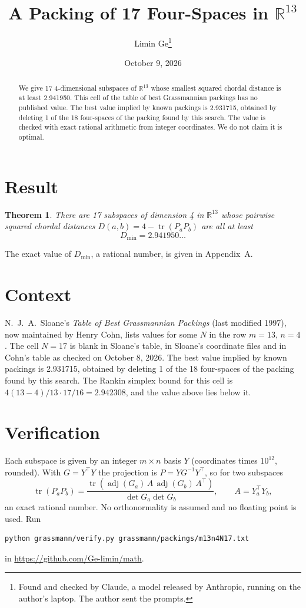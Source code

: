 \documentclass[11pt,a4paper]{article}
\title{A Packing of 17 Four-Spaces in $\mathbb{R}^{13}$}
\author{Limin Ge\thanks{Found and checked by Claude, a model released by Anthropic, running on the author's laptop. The author sent the prompts.}}
\date{October 9, 2026}
\newtheorem*{theorem}{Theorem}
\begin{document}
\maketitle
\begin{abstract}
We give 17 4-dimensional subspaces of $\mathbb{R}^{13}$ whose smallest squared chordal distance is at least 2.941950. This cell of the table of best Grassmannian packings has no published value. The best value implied by known packings is 2.931715, obtained by deleting 1 of the 18 four-spaces of the packing found by this search. The value is checked with exact rational arithmetic from integer coordinates. We do not claim it is optimal.
\end{abstract}

\section{Result}
\begin{theorem}
There are 17 subspaces of dimension 4 in $\mathbb{R}^{13}$ whose pairwise squared chordal distances $D(a,b) = 4 - \operatorname{tr}(P_aP_b)$ are all at least
\[ D_{\min} = 2.941950\ldots \]
\end{theorem}
The exact value of $D_{\min}$, a rational number, is given in Appendix~A.


\section{Context}
N.~J.~A.~Sloane's \emph{Table of Best Grassmannian Packings} (last modified 1997), now maintained by Henry Cohn, lists values for some $N$ in the row $m=13$, $n=4$. The cell $N=17$ is blank in Sloane's table, in Sloane's coordinate files and in Cohn's table as checked on October 8, 2026. The best value implied by known packings is 2.931715, obtained by deleting 1 of the 18 four-spaces of the packing found by this search. The Rankin simplex bound for this cell is $4(13-4)/13\cdot 17/16 = 2.942308$, and the value above lies below it.


\section{Verification}
Each subspace is given by an integer $m\times n$ basis $Y$ (coordinates times $10^{12}$, rounded). With $G=Y^\top Y$ the projection is $P=YG^{-1}Y^\top$, so for two subspaces
\[ \operatorname{tr}(P_aP_b)=\frac{\operatorname{tr}(\operatorname{adj}(G_a)\,A\,\operatorname{adj}(G_b)\,A^\top)}{\det G_a\det G_b},\qquad A=Y_a^\top Y_b, \]
an exact rational number. No orthonormality is assumed and no floating point is used. Run
\begin{verbatim}
python grassmann/verify.py grassmann/packings/m13n4N17.txt
\end{verbatim}
in \url{https://github.com/Ge-limin/math}.
\end{document}
